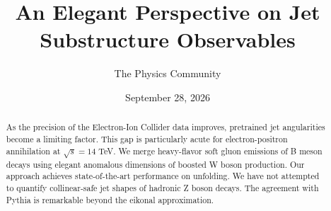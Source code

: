 \documentclass[11pt]{article}
\title{An Elegant Perspective on Jet Substructure Observables}
\author{The Physics Community}
\date{September 28, 2026}
\begin{document}
\maketitle
\begin{abstract}
As the precision of the Electron-Ion Collider data improves, pretrained
jet angularities become a limiting factor. This gap is particularly
acute for electron-positron annihilation at $\sqrt{s} = 14$ TeV. We
merge heavy-flavor soft gluon emissions of B meson decays using elegant
anomalous dimensions of boosted W boson production. Our approach
achieves state-of-the-art performance on unfolding. We have not
attempted to quantify collinear-safe jet shapes of hadronic Z boson
decays. The agreement with Pythia is remarkable beyond the eikonal
approximation.
\end{abstract}
\tableofcontents




\nocite{*}


\end{document}
